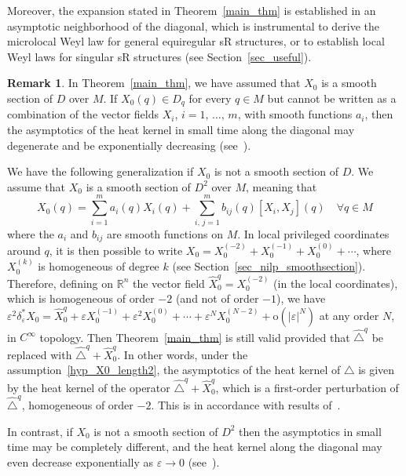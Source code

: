 \documentclass[10pt]{amsart}
\theoremstyle{definition}\newtheorem{defi}[theo]{Definition}\newtheorem{rema}[theo]{Remark}\newtheorem{exam}[theo]{Example}\newtheorem{exem}[theo]{Example}\newtheorem{nota}[theo]{Notation}
\newcommand*\R{\mathbb{R}}
\newcommand{\rmo}{\mathrm{o}}
\let\oldforall\forall
\renewcommand*{\forall}{\mathrel{\oldforall}}
\begin{document}
Moreover, the expansion stated in Theorem~\ref{main_thm} is established in an asymptotic neighborhood of the diagonal, which is instrumental to derive the microlocal Weyl law for general equiregular sR structures, or to establish local Weyl laws for singular sR structures (see Section~\ref{sec_useful}).



\begin{rema}\label{rem_X0_length2}
In Theorem~\ref{main_thm}, we have assumed that $X_0$ is a smooth section of $D$ over $M$. If $X_0(q)\in D_q$ for every $q\in M$ but cannot be written as a combination of the vector fields $X_i$, $i=1,\,\ldots,\,m$, with smooth functions $a_i$, then the asymptotics of the heat kernel in small time along the diagonal may degenerate and be exponentially decreasing (see~\cite{BenArousLeandre_PTRF1991_1,BenArousLeandre_PTRF1991_2}).

We have the following generalization if $X_0$ is not a smooth section of $D$. We assume that $X_0$ is a smooth section of $D^2$ over $M$, meaning that
\begin{equation}\label{hyp_X0_length2}
X_0(q) = \sum_{i=1}^m a_i(q) X_i(q) + \sum_{i,\,j=1}^m b_{ij}(q) [X_i,X_j](q)\quad \forall q\in M
\end{equation}
where the $a_i$ and $b_{ij}$ are smooth functions on $M$. In local privileged coordinates around $q$, it is then possible to write $X_0 = X_0^{(-2)} + X_0^{(-1)} + X_0^{(0)} + \cdots$, where $X_0^{(k)}$ is homogeneous of degree $k$ (see Section~\ref{sec_nilp_smoothsection}). Therefore, defining on $\R^n$ the vector field $\widehat{X}_0^{q}=X_0^{(-2)}$ (in the local coordinates), which is homogeneous of order $-2$ (and not of order $-1$), we have $\varepsilon^2\delta_\varepsilon^* X_0 = \widehat{X}_0^{q} + \varepsilon X_0^{(-1)} + \varepsilon^2 X_0^{(0)} + \cdots + \varepsilon^NX_0^{(N-2)} + \rmo(\vert\varepsilon\vert^N)$ at any order $N$, in $C^\infty$ topology. Then Theorem~\ref{main_thm} is still valid provided that $\widehat{\triangle}^{q}$ be replaced with $\widehat{\triangle}^{q}+\widehat{X}_0^{q}$. In other words, under the assumption~\eqref{hyp_X0_length2}, the asymptotics of the heat kernel of $\triangle$ is given by the heat kernel of the operator $\widehat{\triangle}^{q}+\widehat{X}_0^{q}$, which is a first-order perturbation of $\widehat{\triangle}^{q}$, homogeneous of order $-2$. This is in accordance with results of~\cite{BenArousLeandre_PTRF1991_2}.

In contrast, if $X_0$ is not a smooth section of $D^2$ then the asymptotics in small time may be completely different, and the heat kernel along the diagonal may even decrease exponentially as $\varepsilon\rightarrow 0$ (see~\cite{BenArousLeandre_PTRF1991_2}).
\end{rema}
\end{document}
